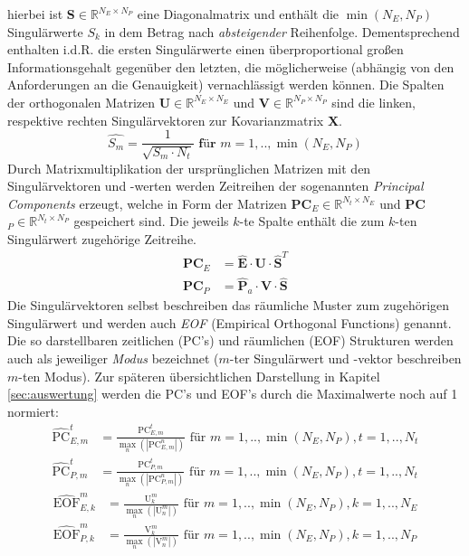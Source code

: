 \documentclass[12pt,a4paper,onecolumn]{scrartcl}
\begin{document}
hierbei ist \textbf{S}$\in \mathbb{R}^{N_E \times N_P}$ eine Diagonalmatrix und enthält die $\min(N_E,N_P)$ Singulärwerte $S_k$ in dem Betrag nach \textit{absteigender} Reihenfolge. Dementsprechend enthalten i.d.R. die ersten Singulärwerte einen überproportional großen Informationsgehalt gegenüber den letzten, die möglicherweise (abhängig von den Anforderungen an die Genauigkeit) vernachlässigt werden können. Die Spalten der orthogonalen Matrizen \textbf{U}$\in \mathbb{R}^{N_E \times N_E}$ und \textbf{V}$\in \mathbb{R}^{N_P \times N_P}$ sind die linken, respektive rechten Singulärvektoren zur Kovarianzmatrix \textbf{X}. 
\begin{equation}
\hat{S_m}= \frac{1}{\sqrt{S_m\cdot N_t}}\textbf{ für } m=1,..,\min(N_E,N_P)
\end{equation}
Durch Matrixmultiplikation der ursprünglichen Matrizen mit den Singulärvektoren und -werten werden Zeitreihen der sogenannten \textit{Principal Components} erzeugt, welche in Form der Matrizen \textbf{PC}$_E\in \mathbb{R}^{N_t \times N_E}$ und \textbf{PC}$_P\in \mathbb{R}^{N_t \times N_P}$ gespeichert sind. Die jeweils $k$-te Spalte enthält die zum $k$-ten Singulärwert zugehörige Zeitreihe.
\begin{align}
\textbf{PC}_E &= \hat{\textbf{E}} \cdot \textbf{U} \cdot \hat{\textbf{S}}^T \\ \textbf{PC}_P &= \hat{\textbf{P}}_a \cdot \textbf{V} \cdot \hat{\textbf{S}}
\end{align}
Die Singulärvektoren selbst beschreiben das räumliche Muster zum zugehörigen Singulärwert und werden auch \textit{EOF} (Empirical Orthogonal Functions) genannt. Die so darstellbaren zeitlichen (PC's) und räumlichen (EOF) Strukturen werden auch als jeweiliger \textit{Modus} bezeichnet ($m$-ter Singulärwert und -vektor beschreiben $m$-ten Modus). Zur späteren übersichtlichen Darstellung in Kapitel \ref{sec:auswertung} werden die PC's und EOF's durch die Maximalwerte noch auf 1 normiert:
\begin{align}
\widehat{\text{PC}}_{E,m}^t &= \frac{\text{PC}_{E,m}^t}{\max\limits_n(|\text{PC}_{E,m}^n|)} \text{ für } m = 1,..,\min(N_E,N_P), t = 1,..,N_t \\
\widehat{\text{PC}}_{P,m}^t &= \frac{\text{PC}_{P,m}^t}{\max\limits_n(|\text{PC}_{P,m}^n|)} \text{ für } m = 1,..,\min(N_E,N_P), t = 1,..,N_t
\end{align}
\begin{align}
\widehat{\text{EOF}}_{E,k}^m &= \frac{\text{U}_{k}^m}{\max\limits_n(|\text{U}_{n}^m|)} \text{ für } m = 1,..,\min(N_E,N_P), k = 1,..,N_E \\
\widehat{\text{EOF}}_{P,k}^m &= \frac{\text{V}_{k}^m}{\max\limits_n(|\text{V}_{n}^m|)} \text{ für } m = 1,..,\min(N_E,N_P), k = 1,..,N_P 
\end{align}
\end{document}
